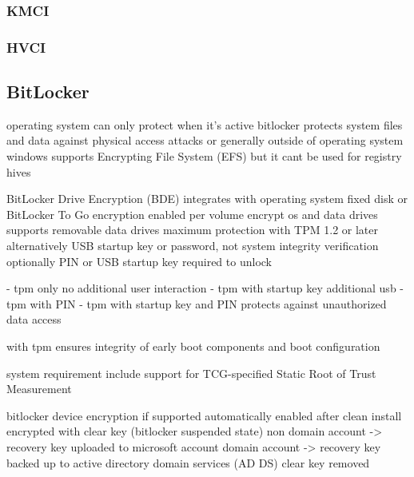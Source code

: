 \subsubsection{KMCI}
\subsubsection{HVCI}

\subsection{BitLocker}
\cite{microsoft-how-windows-uses-the-tpm}


operating system can only protect when it's active
bitlocker protects system files and data against physical access attacks or generally outside of operating system
windows supports Encrypting File System (EFS) but it cant be used for registry hives
\cite[9. BitLocker Drive encryption]{windows-internals-6-part2}

\cite{microsoft-bitlocker-overview}
\cite{microsoft-bitlocker-device-encryption}
BitLocker Drive Encryption (BDE) integrates with operating system
fixed disk or BitLocker To Go
encryption enabled per volume
encrypt os and data drives
supports removable data drives
maximum protection with TPM 1.2 or later
alternatively USB startup key or password, not system integrity verification
optionally PIN or USB startup key required to unlock

- tpm only
no additional user interaction
- tpm with startup key
additional usb
- tpm with PIN
- tpm with startup key and PIN
protects against unauthorized data access
\cite{microsoft-bitlocker-countermeasures}

with tpm ensures integrity of early boot components and boot configuration


system requirement
include support for TCG-specified Static Root of Trust Measurement

\cite{microsoft-bitlocker-device-encryption}

bitlocker device encryption if supported automatically enabled
after clean install encrypted with clear key (bitlocker suspended state)
non domain account -> recovery key uploaded to microsoft account
domain account -> recovery key backed up to active directory domain services (AD DS)
clear key removed

